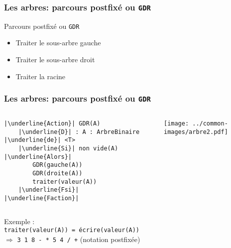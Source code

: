 \documentclass[table,handout,tikz,12pt,svgnames]{beamer}
\begin{document}
\begin{frame}[fragile=singleslide]
	\frametitle{Les arbres: parcours postfixé ou \texttt{GDR}}
	\begin{block}{Parcours postfixé ou \texttt{GDR}}
		\begin{itemize}
			\item Traiter le sous-arbre gauche
			\item Traiter le sous-arbre droit
			\item Traiter la racine
		\end{itemize}
	\end{block}
\end{frame}


\begin{frame}[fragile=singleslide]
	\frametitle{Les arbres: parcours postfixé ou \texttt{GDR}}
	\begin{block}{}
		\begin{columns}[T]
			\begin{column}{0.7\textwidth}
				\begin{verbatim}
|\underline{Action}| GDR(A)
	|\underline{D}| : A : ArbreBinaire |\underline{de}| <T>
	|\underline{Si}| non vide(A) |\underline{Alors}|
		GDR(gauche(A))
		GDR(droite(A))
		traiter(valeur(A))
	|\underline{Fsi}|
|\underline{Faction}|		
				\end{verbatim}
			\end{column}
			\hspace{-2.5cm}
			\hspace{0.2cm}
			\begin{column}{0.38\textwidth}
				\begin{flushright}
					{\texttt{[image: ../common-images/arbre2.pdf]}}
				\end{flushright}
			\end{column}
		\end{columns}
		\vspace{0.5cm}		
		Exemple :\\ \texttt{traiter(valeur(A)) = écrire(valeur(A))}\\
		$\Rightarrow$ \texttt{3 1 8 - * 5 4 / +} (notation postfixée)
	\end{block}
\end{frame}
\end{document}
